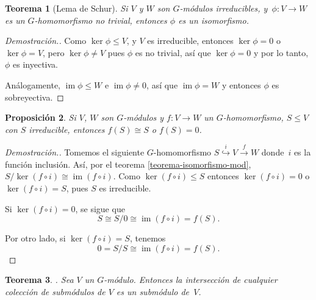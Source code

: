 \documentclass[12pt]{book}
\newtheorem{theorem}{Teorema}[section]
\newtheorem{proposition}[theorem]{Proposición}
\theoremstyle{definition}
\DeclareMathOperator{\im}{im}
\newcounter{in}
\begin{document}
\begin{theorem}[Lema de Schur]
  \label{lema-schur}
  Si $V$ y $W$ son $G$-módulos irreducibles, y~$\phi:V\rightarrow W$
  es un $G$-homomorfismo no trivial, entonces $\phi$ es un isomorfismo.
\end{theorem}

\begin{proof}[Demostración.]
  Como $\ker \phi\leq V$, y $V$ es irreducible, entonces $\ker \phi=0$
  o~$\ker\phi=V$, pero  $\ker\phi\neq V$ pues $\phi$ es no trivial,
  así que $\ker \phi=0$ y por lo tanto, $\phi$ es inyectiva. 

  Análogamente, $\im\phi\leq W$ e $\im \phi\neq 0$, así que $\im
  \phi=W$ y entonces $\phi$ es sobreyectiva.
\end{proof}

\begin{proposition}
  \label{im-mod-irreducible}
  Si $V$, $W$ son $G$-módulos y $f:V\rightarrow W$ un
  $G$-homomorfismo, $S\leq V$ con $S$ irreducible, entonces $f(S)\cong
  S$ o $f(S)=0$.
\end{proposition}

\begin{proof}[Demostración.]
  Tomemos el siguiente $G$-homomorfismo
  $S\stackrel{i}{\hookrightarrow} V\stackrel{f}{\rightarrow}W$
  donde~$i$ es la función inclusión. Así, por el teorema \ref{teorema-isomorfismo-mod}, $S/\ker(f\circ
  i)\cong\im(f\circ i)$. Como $\ker(f\circ
  i)\leq S$ entonces $\ker(f\circ i)=0$ o $\ker(f\circ i)=S$, pues $S$
  es irreducible.

  Si $\ker(f\circ i)=0$, se sigue que
  $$S\cong S/0\cong\im(f\circ i)=f(S).$$

  Por otro lado, si $\ker(f\circ i)=S$, tenemos
  $$0=S/S\cong\im(f\circ i)=f(S).$$
\end{proof}
\begin{theorem}{.}
  \label{interseccion-submodulos}
  Sea $V$ un $G$-módulo. Entonces la intersección de cualquier
  colección de submódulos de $V$ es un submódulo de~$V$.
\end{theorem}
\end{document}
